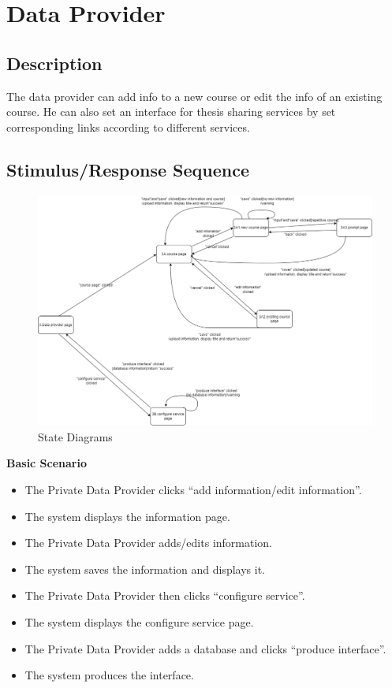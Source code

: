 \section{Data Provider}

\subsection{Description}
The data provider can add info to a new course or edit the info of an existing course. He can also set an interface for thesis sharing services by set corresponding links according to different services.

\subsection{Stimulus/Response Sequence}

\begin{figure}[H]
    \centering
    \includegraphics[width=0.75\linewidth]{picture/WechatIMG1904.jpg}
    \caption{State Diagrams}
    \label{fig:enter-label}
\end{figure}

\textbf{Basic Scenario}
\begin{itemize}
    \item The Private Data Provider clicks “add information/edit information”.
    \item The system displays the information page.
    \item The Private Data Provider adds/edits information.
    \item The system saves the information and displays it.
    \item The Private Data Provider then clicks “configure service”.
    \item The system displays the configure service page.
    \item The Private Data Provider adds a database and clicks “produce interface”.
    \item The system produces the interface.
\end{itemize}


